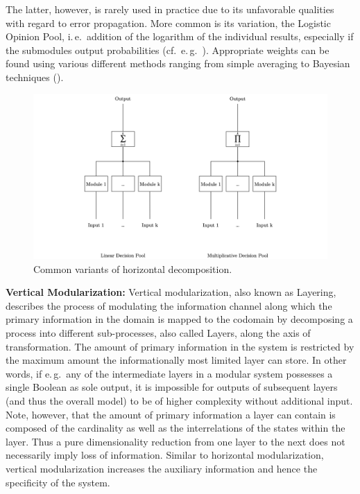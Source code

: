 The latter, however, is rarely used in practice due to its unfavorable qualities with regard to error propagation. More common is its variation, the Logistic Opinion Pool, i.\,e.\ addition of the logarithm of the individual results, especially if the submodules output probabilities (cf.\ e.\,g.\ \cite{Benediktsson1992-bl}). Appropriate weights can be found using various different methods ranging from simple averaging to Bayesian techniques (\cite{Xu1992-hp}).

\begin{figure}[htb]
    \centering
	    \includegraphics[width=\textwidth, trim=150 0 150 0, clip]{thesis/graphics/graphics/horizontal_decomposition.jpeg}
    \caption{Common variants of horizontal decomposition.}
    \label{fig:compnet_modularization_types_horizontal_decomposition}
\end{figure}

\textbf{Vertical Modularization:} Vertical modularization, also known as Layering, describes the process of modulating the information channel along which the primary information in the domain is mapped to the codomain by decomposing a process into different sub-processes, also called Layers, along the axis of transformation. The amount of primary information in the system is restricted by the maximum amount the informationally most limited layer can store. In other words, if e.\,g.\ any of the intermediate layers in a modular system possesses a single Boolean as sole output, it is impossible for outputs of subsequent layers (and thus the overall model) to be of higher complexity without additional input. Note, however, that the amount of primary information a layer can contain is composed of the cardinality as well as the interrelations of the states within the layer. Thus a pure dimensionality reduction from one layer to the next does not necessarily imply loss of information. Similar to horizontal modularization, vertical modularization increases the auxiliary information and hence the specificity of the system.

